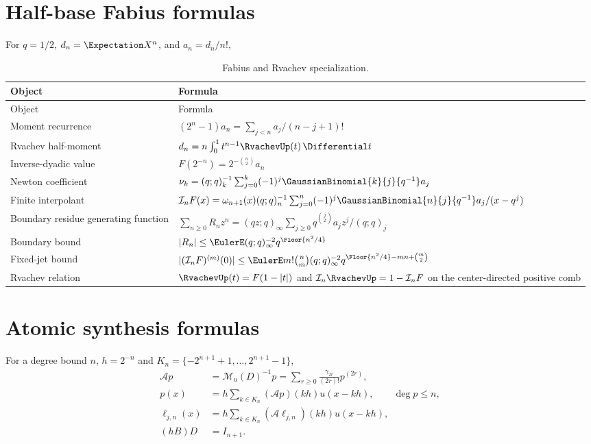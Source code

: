 \documentclass[11pt,oneside]{book}
\numberwithin{equation}{chapter}
\theoremstyle{definition}
\theoremstyle{remark}
\newcommand{\App}{\mathcal A}
\newcommand{\Interp}{\mathcal I}
\newcommand{\MGF}{\mathcal M}
\begin{document}
\section{Half-base Fabius formulas}

For $q=1/2$, $d_n=\Expectation X^n$, and $a_n=d_n/n!$,
\begin{longtable}{@{}p{}p{}@{}}
\caption{Fabius and Rvachev specialization.}\label{tab:formula-dictionary-fabius}\\
\toprule
Object & Formula\\
\midrule
\endfirsthead
\toprule
Object & Formula\\
\midrule
\endhead
Moment recurrence
& $(2^n-1)a_n=\sum_{j<n}a_j/(n-j+1)!$\\[5pt]
Rvachev half-moment
& $d_n=n\int_0^1t^{n-1}\RvachevUp(t)\,\Differential t$\\[5pt]
Inverse-dyadic value
& $F(2^{-n})=2^{-\binom n2}a_n$\\[5pt]
Newton coefficient
& $\nu_k=(q;q)_k^{-1}\sum_{j=0}^k(-1)^j
 \GaussianBinomial{k}{j}{q^{-1}}a_j$\\[6pt]
Finite interpolant
& $\Interp_nF(x)=\omega_{n+1}(x)(q;q)_n^{-1}
 \sum_{j=0}^n(-1)^j\GaussianBinomial{n}{j}{q^{-1}}a_j/(x-q^j)$\\[7pt]
Boundary residue generating function
& $\sum_{n\ge0}R_nz^n=(qz;q)_\infty
 \sum_{j\ge0}q^{\binom j2}a_jz^j/(q;q)_j$\\[7pt]
Boundary bound
& $|R_n|\le\EulerE(q;q)_\infty^{-2}q^{\Floor{n^2/4}}$\\[5pt]
Fixed-jet bound
& $|(\Interp_nF)^{(m)}(0)|\le
 \EulerE m!\binom nm(q;q)_\infty^{-2}
 q^{\Floor{n^2/4}-mn+\binom m2}$\\[7pt]
Rvachev relation
& $\RvachevUp(t)=F(1-|t|)$ and $\Interp_n\RvachevUp=1-\Interp_nF$
 on the center-directed positive comb\\
\bottomrule
\end{longtable}

\section{Atomic synthesis formulas}

For a degree bound $n$, $h=2^{-n}$ and
$K_n=\{-2^{n+1}+1,\ldots,2^{n+1}-1\}$,
\begin{align}
 \App p&=\MGF_u(D)^{-1}p
 =\sum_{r\ge0}\frac{\gamma_{2r}}{(2r)!}p^{(2r)},
 \label{eq:dictionary-App}\\
 p(x)&=h\sum_{k\in K_n}(\App p)(kh)u(x-kh),
 \qquad \deg p\le n,
 \label{eq:dictionary-synthesis}\\
 \ell_{j,n}(x)&=h\sum_{k\in K_n}
 (\App\ell_{j,n})(kh)u(x-kh),
 \label{eq:dictionary-cardinal-synthesis}\\
 (hB)D&=I_{n+1}.
 \label{eq:dictionary-right-inverse}
\end{align}
\end{document}
